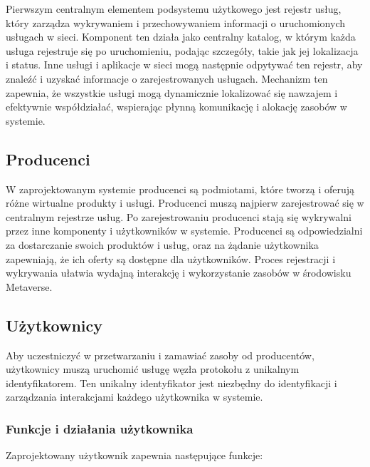 Pierwszym centralnym elementem podsystemu użytkowego jest rejestr usług, który zarządza wykrywaniem i przechowywaniem informacji o uruchomionych usługach w sieci. Komponent ten działa jako centralny katalog, w którym każda usługa rejestruje się po uruchomieniu, podając szczegóły, takie jak jej lokalizacja i status. Inne usługi i aplikacje w sieci mogą następnie odpytywać ten rejestr, aby znaleźć i uzyskać informacje o zarejestrowanych usługach. Mechanizm ten zapewnia, że wszystkie usługi mogą dynamicznie lokalizować się nawzajem i efektywnie współdziałać, wspierając płynną komunikację i alokację zasobów w systemie.

\subsection{Producenci}

W zaprojektowanym systemie producenci są podmiotami, które tworzą i oferują różne wirtualne produkty i usługi. Producenci muszą najpierw zarejestrować się w centralnym rejestrze usług. Po zarejestrowaniu producenci stają się wykrywalni przez inne komponenty i użytkowników w systemie. Producenci są odpowiedzialni za dostarczanie swoich produktów i usług, oraz na żądanie użytkownika zapewniają, że ich oferty są dostępne dla użytkowników. Proces rejestracji i wykrywania ułatwia wydajną interakcję i wykorzystanie zasobów w środowisku Metaverse.

\subsection{Użytkownicy}

Aby uczestniczyć w przetwarzaniu i zamawiać zasoby od producentów, użytkownicy muszą uruchomić usługę węzła protokołu z unikalnym identyfikatorem. Ten unikalny identyfikator jest niezbędny do identyfikacji i zarządzania interakcjami każdego użytkownika w systemie.

\subsubsection{Funkcje i działania użytkownika}

Zaprojektowany użytkownik zapewnia następujące funkcje:


